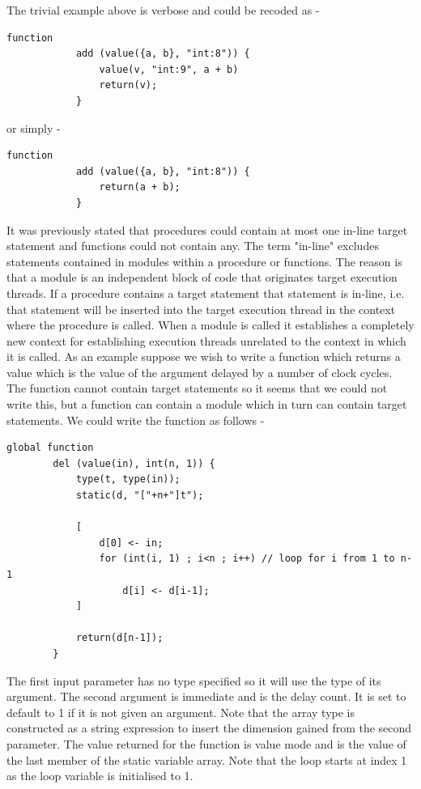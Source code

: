         The trivial example above is verbose and could be recoded as -
        \begin{lstlisting}[language=threepl]
            function
            add (value({a, b}, "int:8")) {
                value(v, "int:9", a + b)
                return(v);
            }
        \end{lstlisting}
        or simply -
        \begin{lstlisting}[language=threepl]
            function
            add (value({a, b}, "int:8")) {
                return(a + b);
            }
        \end{lstlisting}

        It was previously stated that procedures could contain at most one in-line
        target statement and functions could not contain any. The term "in-line"
        excludes statements contained in modules within a procedure or functions. The
        reason is that a module is an independent block of code that originates target
        execution threads. If a procedure contains a target statement that statement is
        in-line, i.e. that statement will be inserted into the target execution thread
        in the context where the procedure is called. When a module is called it
        establishes a completely new context for establishing execution threads
        unrelated to the context in which it is called. As an example suppose we wish
        to write a function which returns a value which is the value of the argument
        delayed by a number of clock cycles. The function cannot contain target
        statements so it seems that we could not write this, but a function can contain
        a module which in turn can contain target statements. We could write the
        function as follows -
        \pagebreak
        \begin{lstlisting}[language=threepl]
        global function
        del (value(in), int(n, 1)) {
            type(t, type(in));
            static(d, "["+n+"]t");

            [
                d[0] <- in;
                for (int(i, 1) ; i<n ; i++) // loop for i from 1 to n-1
                    d[i] <- d[i-1];
            ]

            return(d[n-1]);
        }
        \end{lstlisting}
        The first input parameter has no type specified so it will use the type of its
        argument. The second argument is immediate and is the delay count. It is set to
        default to 1 if it is not given an argument. Note that the array type is
        constructed as a string expression to insert the dimension gained from the
        second parameter. The value returned for the function is value mode and is the
        value of the last member of the static variable array. Note that the loop
        starts at index 1 as the loop variable  is initialised to 1.

